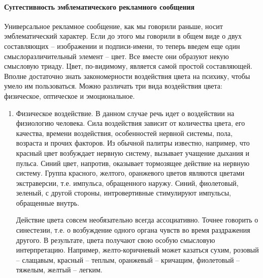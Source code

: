 \paragraph{Суггестивность эмблематического рекламного сообщения}
Универсальное рекламное сообщение, как мы говорили раньше, носит эмблематический
характер. Если  до этого мы говорили в общем виде о двух составляющих --
изображении и подписи-имени, то теперь введем еще один смыслоразличительный
элемент -- цвет. Все вместе они образуют некую смысловую триаду. Цвет,
по-видимому, является самой простой составляющей. Вполне достаточно знать
закономерности воздействия цвета на психику, чтобы умело им пользоваться.
Можно различать три вида воздействия цвета: физическое, оптическое и
эмоциональное.\autocite{tsoygner1971}\autocite{serov1997estetika}\autocite{kandinsky2001dohovnom}
\begin{enumerate}
\item Физическое воздействие. В данном случае речь идет о воздействии на
  физиологию человека. Сила воздействия зависит от количества цвета,
  его качества, времени воздействия, особенностей нервной системы, пола,
  возраста и прочих факторов. Из обычной палитры известно, например, что
  красный цвет возбуждает нервную систему, вызывает учащение дыхания и
  пульса. Синий цвет, напротив, оказывает тормозящее действие на нервную
  систему. Группа красного, желтого, оранжевого цветов являются цветами
  экстраверсии, т.е. импульса, обращенного наружу. Синий, фиолетовый,
  зеленый, с другой стороны,  интровертивные стимулируют импульсы, обращенные
  внутрь.

  Действие цвета совсем необязательно всегда ассоциативно. Точнее говорить о
  синестезии, т.е. о возбуждение одного органа чувств во время раздражения
  другого. В результате, цвета получают свою особую смысловую интерпретацию.
  Например, желто-коричневый может казаться сухим,  розовый -- слащавым,
  красный -- теплым, оранжевый -- кричащим, фиолетовый -- тяжелым, желтый -- легким.


\end{enumerate}

